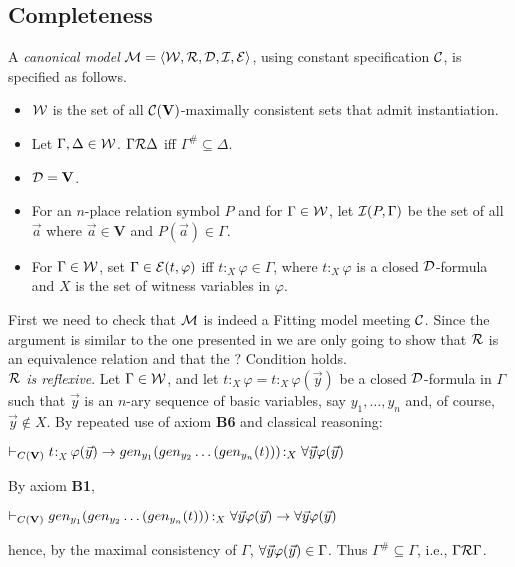 \subsection{Completeness}

\begin{defn}
	A \textit{canonical model} $\mathcal{M} = \langle\mathcal{W},\mathcal{R},\mathcal{D},\mathcal{I},\mathcal{E} \rangle$, using constant specification $\mathcal{C}$, is specified as follows.
	
	\begin{itemize}
		\item $\mathcal{W}$ is the set of all $\mathcal{C}(\textbf{V})$-maximally consistent sets that admit instantiation.
		\item Let $\Gamma, \Delta \in \mathcal{W}$. $\Gamma\mathcal{R}\Delta$ iff $\Gamma^{\#} \subseteq  \Delta$.
		\item $\mathcal{D} = \textbf{V}$.
		\item For an $n$-place relation symbol $P$ and for $\Gamma \in \mathcal{W}$, let $\mathcal{I}(P,\Gamma)$ be the set of all $\vec{a}$ where $\vec{a} \in \textbf{V}$ and $P(\vec{a}) \in \Gamma$.
		\item For $\Gamma \in \mathcal{W}$, set $\Gamma \in \mathcal{E}(t,\varphi)$ iff $t$$:_{X}$$\varphi \in \Gamma$, where $t$$:_{X}$$\varphi$ is a closed $\mathcal{D}$-formula and $X$ is the set of witness variables in $\varphi$.
	\end{itemize}
\end{defn}


\qquad First we need to check that $\mathcal{M}$ is indeed a Fitting model meeting $\mathcal{C}$. Since the argument is similar to the one presented in \cite[pp. 13-14]{Fitting14} we are only going to show that $\mathcal{R}$ is an equivalence relation and that the $?$ Condition holds.  \\

\qquad \textit{$\mathcal{R}$ is reflexive}. Let $\Gamma \in \mathcal{W}$, and let $t$$:_{X}$$\varphi = t$$:_{X}$$\varphi(\vec{y})$ be a closed $\mathcal{D}$-formula in $\Gamma$ such that $\vec{y}$ is an $n$-ary sequence of basic variables, say $y_{1}, \dots, y_{n}$ and, of course, $\vec{y} \notin X$. By repeated use of axiom \textbf{B6} and classical reasoning:

\begin{center}
	$\vdash_{C(\textbf{V})}t$$:_{X}$$\varphi(\vec{y}) \rightarrow gen_{y_{1}}(gen_{y_{2}} \dots (gen_{y_{n}}(t)))$$:_{X}\forall \vec{y} \varphi(\vec{y})$
\end{center}
By axiom \textbf{B1},

\begin{center}
	$\vdash_{C(\textbf{V})} gen_{y_{1}}(gen_{y_{2}} \dots (gen_{y_{n}}(t)))$$:_{X}\forall \vec{y} \varphi(\vec{y}) \rightarrow \forall \vec{y} \varphi(\vec{y})$
\end{center}
hence, by the maximal consistency of $\Gamma$, $\forall \vec{y} \varphi(\vec{y}) \in \Gamma$. Thus $\Gamma^{\#} \subseteq \Gamma$, i.e., $\Gamma\mathcal{R}\Gamma$.\\

